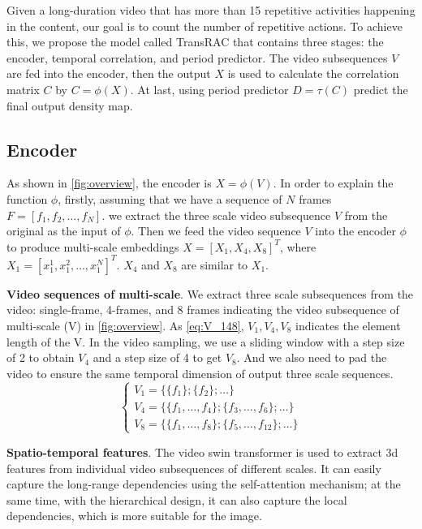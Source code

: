 \documentclass[10pt,twocolumn,letterpaper]{article}
\begin{document}
\label{sec:TransRAC Model}
Given a long-duration video that has more than 15 repetitive activities happening in the content, our goal is to count the number of repetitive actions. To achieve this, we propose the model called TransRAC that contains three stages: the encoder, temporal correlation, and period predictor. The video subsequences $V$ are fed into the encoder, then the output $X$ is used to calculate the correlation matrix $C$ by $C=\phi(X)$. At last, using period predictor $D=\tau(C)$ predict the final output density map.
\subsection{Encoder}

As shown in \cref{fig:overview}, the encoder is $X = \phi(V)$. In order to explain the function $\phi$, firstly, assuming that we have a sequence of $N$ frames $F = [f_1,f_2,\dots,f_N]$. we extract the three scale video  subsequence $V$ from the original as the input of $\phi$. Then we feed the video sequence $V$ into the encoder $\phi$ to produce multi-scale embeddings $X = [X_1,X_4,X_8]^T$, where $X_1 = [x_1^1,x_1^2,\dots,x_1^N]^T$. $X_4$ and $X_8 $ are similar to $X_1$. 

\noindent \textbf{Video sequences of multi-scale}. We extract three scale subsequences from the video: single-frame, 4-frames, and 8 frames indicating the video subsequence of multi-scale (V) in \cref{fig:overview}. As \cref{eq:V_148}, $V_1, V_4, V_8$ indicates the element length of the V. In the video sampling, we use a sliding window with a step size of 2 to obtain $V_4$ and a step size of 4 to get $V_8$. And we also need to pad the video to ensure the same temporal dimension of output three scale sequences.
\begin{equation}
\left \{ 
\begin{array}{c}
    V_1 = \{\{f_1\};\{f_2\};\dots\}    \\
    V_4 =\{\{f_1,\dots,f_4\};\{f_3,\dots,f_6\};\dots\} \\
    V_8 = \{\{f_1,\dots,f_8\};\{f_5,\dots,f_{12}\};\dots\} 
\end{array}
\right.
\label{eq:V_148}
\end{equation}



\noindent \textbf{Spatio-temporal features}. The video swin transformer\cite{video-swin-transformer} is  used to extract 3d features from individual video subsequences of different scales. It can easily capture the long-range dependencies using the self-attention mechanism; at the same time, with the hierarchical design, it can also capture the local dependencies, which is more suitable for the image.
\end{document}
